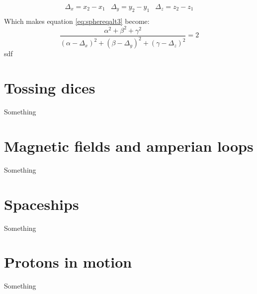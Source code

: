\begin{equation}\label{eq:sphereqaltsub2}
    \begin{array}{ccc}
        \Delta_x = x_2 - x_1 & \Delta_y = y_2 - y_1 & \Delta_z = z_2 - z_1 \\
    \end{array}
\end{equation}
Which makes equation \ref{eq:sphereqalt3} become:
\begin{equation}\label{eq:sphereqalt4}
    \frac{\alpha^2 + \beta^2 + \gamma^2}{(\alpha  - \Delta_x)^2 + (\beta - \Delta_y)^2 + (\gamma - \Delta_z)^2} = 2
\end{equation}
sdf

\section{Tossing dices}
\label{sec:dices}
Something

\section{Magnetic fields and amperian loops}
\label{sec:magnamp}
Something

\section{Spaceships}
\label{sec:spaceship}
Something

\section{Protons in motion}
\label{sec:protons}
Something
